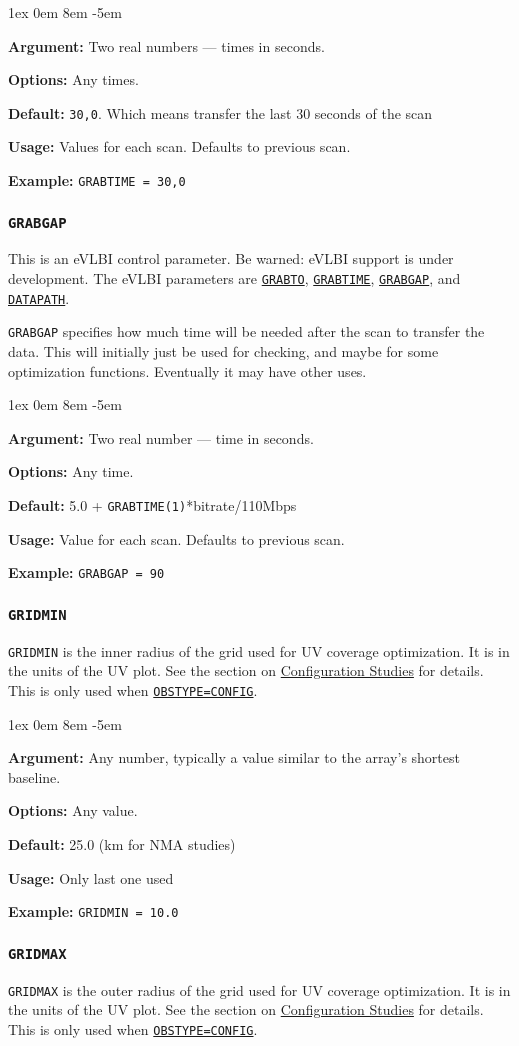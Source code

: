 \documentclass{report}
\newcommand{\rcwbox}[5]{
  \begin{list}{}{\parsep 1ex  \itemsep 0em
                 \leftmargin 8em  \itemindent -5em }
    \item {\bf Argument:} #1
    \item {\bf Options:}  #2
    \item {\bf Default:}  #3
    \item {\bf Usage:}    #4
    \item {\bf Example:}  #5
  \end{list}
}
\begin{document}
\rcwbox
{ Two real numbers --- times in seconds.}
{ Any times.}
{{\tt 30,0}.  Which means transfer the last 30 seconds of the scan}
{Values for each scan.  Defaults to previous scan.}
{{\tt GRABTIME = 30,0 }}


\subsubsection{\label{MP:GRABGAP}{\tt GRABGAP}}

This is an eVLBI control parameter.  Be warned: eVLBI support is
under development.
The eVLBI parameters are 
{\hyperref[MP:GRABTO]{{\tt GRABTO}}},
{\hyperref[MP:GRABTIME]{{\tt GRABTIME}}}, 
{\hyperref[MP:GRABGAP]{{\tt GRABGAP}}},
and 
{\hyperref[MP:DATAPATH]{{\tt DATAPATH}}}.

{\tt GRABGAP} specifies how much time will be needed after the
scan to transfer the data.  This will initially just be used for
checking, and maybe for some optimization functions.  Eventually
it may have other uses.

\rcwbox
{ Two real number --- time in seconds.}
{ Any time.}
{5.0 + {\tt GRABTIME(1)}*bitrate/110Mbps}
{Value for each scan.  Defaults to previous scan.}
{{\tt GRABGAP = 90 }}

\subsubsection{\label{MP:GRIDMIN}{\tt GRIDMIN}}

{\tt GRIDMIN} is the inner radius of the grid used for UV
coverage optimization.  It is in the units of the UV plot.
See the section on 
{\hyperref[SEC:CONFIG]{Configuration Studies}}
for details.  This is only used when
{\hyperref[MP:OBSTYPE]{{\tt OBSTYPE=CONFIG}}}.

\rcwbox
{Any number, typically a value similar to the array's shortest baseline.}
{Any value.}
{25.0 (km for NMA studies)}
{Only last one used}
{{\tt GRIDMIN = 10.0}}

\subsubsection{\label{MP:GRIDMAX}{\tt GRIDMAX}}

{\tt GRIDMAX} is the outer radius of the grid used for UV
coverage optimization.  It is in the units of the UV plot.
See the section on 
{\hyperref[SEC:CONFIG]{Configuration Studies}} for details.
This is only used when
{\hyperref[MP:OBSTYPE]{{\tt OBSTYPE=CONFIG}}}.
\end{document}
